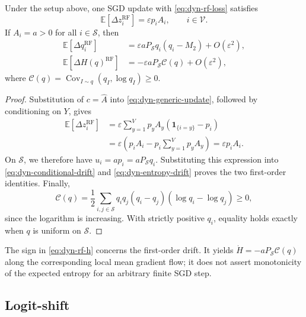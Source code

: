 \begin{lemma}
\label{lem:dyn-reinforce}
Under the setup above, one SGD update with
\eqref{eq:dyn-rf-loss} satisfies
\begin{equation}
 \mathbb E[\Delta z_i^{\mathrm{RF}}]
 =\varepsilon p_iA_i,\qquad i\in\mathcal V.
 \label{eq:dyn-rf-mean}
\end{equation}
If $A_i=a>0$ for all $i\in\mathcal S$, then
\begin{align}
 \mathbb E[\Delta q_i^{\mathrm{RF}}]
 &=\varepsilon aP_{\mathcal S}q_i(q_i-M_2)+O(\varepsilon^2),
 \label{eq:dyn-rf-q}\\
 \mathbb E[\Delta H(q)^{\mathrm{RF}}]
 &=-\varepsilon aP_{\mathcal S}\mathcal C(q)+O(\varepsilon^2),
 \label{eq:dyn-rf-h}
\end{align}
where $\mathcal C(q)=\operatorname{Cov}_{I\sim q}(q_I,\log q_I)\ge0$.
\end{lemma}

\begin{proof}
Substitution of $c=\widehat A$ into
\eqref{eq:dyn-generic-update}, followed by conditioning on $Y$, gives
\begin{align*}
 \mathbb E[\Delta z_i^{\mathrm{RF}}]
 &=\varepsilon\sum_{y=1}^V p_yA_y
                 (\mathbf 1_{\{i=y\}}-p_i)\\
 &=\varepsilon\left(p_iA_i-p_i\sum_{y=1}^V p_yA_y\right)
 =\varepsilon p_iA_i.
\end{align*}
On $\mathcal S$, we therefore have
$u_i=ap_i=aP_{\mathcal S}q_i$. Substituting this expression into
\eqref{eq:dyn-conditional-drift} and \eqref{eq:dyn-entropy-drift}
proves the two first-order identities. Finally,
\begin{equation}
 \mathcal C(q)=\frac12\sum_{i,j\in\mathcal S}
 q_iq_j(q_i-q_j)(\log q_i-\log q_j)\ge0,
 \label{eq:dyn-covariance-sign}
\end{equation}
since the logarithm is increasing. With strictly positive $q_i$, equality
holds exactly when $q$ is uniform on $\mathcal S$.
\end{proof}

The sign in \eqref{eq:dyn-rf-h} concerns the first-order drift. It yields
$\dot H=-aP_{\mathcal S}\mathcal C(q)$ along the corresponding local
mean gradient flow; it does not assert monotonicity of the expected entropy
for an arbitrary finite SGD step.

\subsection{Logit-shift}
\label{app:dynamics-logit-shift}

